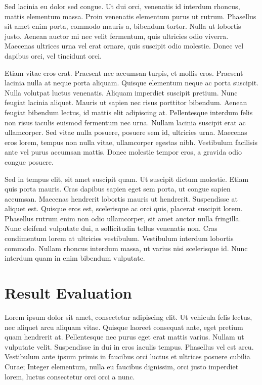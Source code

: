 \documentclass[12pt,oneside,a4paper,parskip]{scrbook}
\begin{document}
Sed lacinia eu dolor sed congue. Ut dui orci, venenatis id interdum rhoncus, mattis elementum massa. Proin venenatis elementum purus ut rutrum. Phasellus sit amet enim porta, commodo mauris a, bibendum tortor. Nulla ut lobortis justo. Aenean auctor mi nec velit fermentum, quis ultricies odio viverra. Maecenas ultrices urna vel erat ornare, quis suscipit odio molestie. Donec vel dapibus orci, vel tincidunt orci.

Etiam vitae eros erat. Praesent nec accumsan turpis, et mollis eros. Praesent lacinia nulla at neque porta aliquam. Quisque elementum neque ac porta suscipit. Nulla volutpat luctus venenatis. Aliquam imperdiet suscipit pretium. Nunc feugiat lacinia aliquet. Mauris ut sapien nec risus porttitor bibendum. Aenean feugiat bibendum lectus, id mattis elit adipiscing at. Pellentesque interdum felis non risus iaculis euismod fermentum nec urna. Nullam lacinia suscipit erat ac ullamcorper. Sed vitae nulla posuere, posuere sem id, ultricies urna. Maecenas eros lorem, tempus non nulla vitae, ullamcorper egestas nibh. Vestibulum facilisis ante vel purus accumsan mattis. Donec molestie tempor eros, a gravida odio congue posuere.

Sed in tempus elit, sit amet suscipit quam. Ut suscipit dictum molestie. Etiam quis porta mauris. Cras dapibus sapien eget sem porta, ut congue sapien accumsan. Maecenas hendrerit lobortis mauris ut hendrerit. Suspendisse at aliquet est. Quisque eros est, scelerisque ac orci quis, placerat suscipit lorem. Phasellus rutrum enim non odio ullamcorper, sit amet auctor nulla fringilla. Nunc eleifend vulputate dui, a sollicitudin tellus venenatis non. Cras condimentum lorem at ultricies vestibulum. Vestibulum interdum lobortis commodo. Nullam rhoncus interdum massa, ut varius nisi scelerisque id. Nunc interdum quam in enim bibendum vulputate.


\chapter{Result Evaluation}

Lorem ipsum dolor sit amet, consectetur adipiscing elit. Ut vehicula felis lectus, nec aliquet arcu aliquam vitae. Quisque laoreet consequat ante, eget pretium quam hendrerit at. Pellentesque nec purus eget erat mattis varius. Nullam ut vulputate velit. Suspendisse in dui in eros iaculis tempus. Phasellus vel est arcu. Vestibulum ante ipsum primis in faucibus orci luctus et ultrices posuere cubilia Curae; Integer elementum, nulla eu faucibus dignissim, orci justo imperdiet lorem, luctus consectetur orci orci a nunc.
\end{document}
